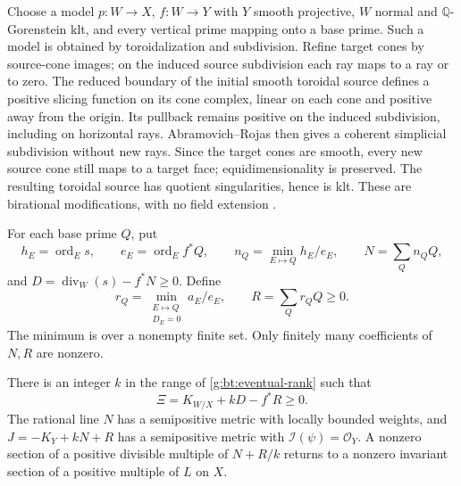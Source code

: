 Choose a model $p:W\to X$, $f:W\to Y$ with $Y$ smooth projective,
$W$ normal and $\mathbb Q$-Gorenstein klt, and every vertical prime
mapping onto a base prime.  Such a model is obtained by toroidalization
and subdivision.  Refine target cones by source-cone images; on the
induced source subdivision each ray maps to a ray or to zero.
The reduced boundary of the initial smooth toroidal source defines a
positive slicing function on its cone complex, linear on each cone and
positive away from the origin. Its pullback remains
positive on the induced subdivision, including on horizontal rays.
Abramovich--Rojas \cite[Corollary~0.11]{AbramovichRojas1998} then gives
a coherent simplicial subdivision without new rays. Since the target
cones are smooth, every new source cone still maps to a target face;
equidimensionality is preserved. The resulting toroidal source has
quotient singularities, hence is klt. These are birational modifications,
with no field extension \cite{ADK2013,AK2000,KKMSD}.

For each base prime $Q$, put
\[
 h_E=\operatorname{ord}_E s,\qquad e_E=\operatorname{ord}_E f^*Q,\qquad
 n_Q=\min_{E\mapsto Q}h_E/e_E,\qquad N=\sum_Qn_Q Q,
\]
and $D=\operatorname{div}_W(s)-f^*N\geq0$.  Define
\[
 r_Q=\min_{\substack{E\mapsto Q\\D_E=0}}a_E/e_E,\qquad
                       R=\sum_Qr_Q Q\geq0.
\]
The minimum is over a nonempty finite set.  Only finitely many
coefficients of $N,R$ are nonzero.

\begin{proposition}
\label{g:bt:large-moment}
There is an integer $k$ in the range of \eqref{g:bt:eventual-rank} such
that
\[
            \Xi=K_{W/X}+kD-f^*R\geq0.
\]
The rational line $N$ has a semipositive metric with locally bounded
weights, and $J=-K_Y+kN+R$ has a semipositive metric with
$\mathcal I(\psi)=\mathcal O_Y$.
A nonzero section of a positive divisible multiple of $N+R/k$ returns
to a nonzero invariant section of a positive multiple of $L$ on $X$.
\end{proposition}

